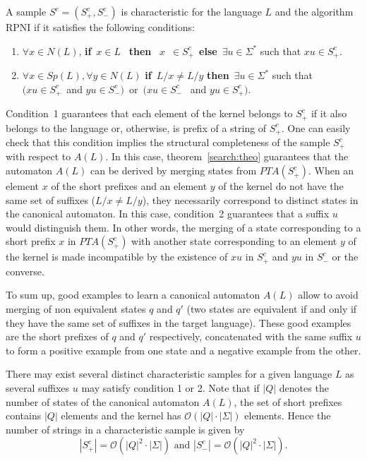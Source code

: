 \begin{definition}
A sample $S^c=(S_{+}^c,S_{-}^c)$ is characteristic for
the language $L$ and the algorithm RPNI if it satisfies the
following conditions: 
\begin{enumerate}
\item  $\forall x\in N(L)$, \textbf{if}\ $x\in L$ \ \textbf{then
}\ $x$\ $\in S_{+}^c$\ \textbf{else}\ $\exists u\in \Sigma ^{*}$ such that $xu\in S_{+}^c$.

\item  $\forall x\in Sp(L),\forall y\in N(L)$ \textbf{if}\ $L/x\neq
L/y$ \textbf{then}\ $\exists u\in \Sigma ^{*}$ such that \\$(xu\in S_{+}^c$\ and $yu\in S_{-}^c)$\ or\ $(xu\in S_{-}^c$
\ and $yu\in S_{+}^c)$.
\end{enumerate}
\label{Characteristic:Sample}
\end{definition}

Condition~1 guarantees that each element of the kernel belongs to $S_{+}^c$ if it also belongs to the language or, otherwise, is prefix of a string of $S_{+}^c$. One can easily check that this condition implies the structural completeness of the sample $S_{+}^c$ with respect to $A(L)$. In this case, theorem~\ref{search:theo} guarantees that the automaton $A(L)$ can be derived by merging states from $PTA(S_{+}^c)$. When an element $x$ of the short prefixes and an element $y$ of the kernel do not have the same set of suffixes ($L/x\neq L/y$), they necessarily correspond to distinct states in the canonical automaton. In this case, condition~2 guarantees that a suffix $u$ would distinguish them. In other words, the merging of a state corresponding to a short prefix $x$ in $PTA(S_{+}^c)$ with another state corresponding to an element $y$ of the kernel is made incompatible by the existence of $xu$ in $S_{+}^c$ and $yu $ in $S_{-}^c$ or the converse.

To sum up, good examples to learn a canonical automaton $A(L)$ allow to avoid merging of non equivalent states $q$ and $q'$ (two states are equivalent if and only if they have the same set of suffixes in the target language). These good examples are the short prefixes of $q$ and $q'$ respectively, concatenated with the same suffix $u$ to form a positive example from one state and a negative example from the other. 

There may exist several distinct characteristic samples for a given language $L$ as several suffixes $u$ may satisfy condition 1 or 2. Note that if $|Q|$ denotes the number of states of the canonical automaton $A(L)$, the set of short prefixes contains $|Q|$ elements and the kernel has $\mathcal{O}(|Q|\cdot |\Sigma |)$ elements. Hence the number of strings in a characteristic sample is given by 
\[
|S_{+}^c|=\mathcal{O}(|Q|^2\cdot |\Sigma |)\mbox{ and }|S_{-}^c|=\mathcal{O}(|Q|^2\cdot |\Sigma |). 
\]


